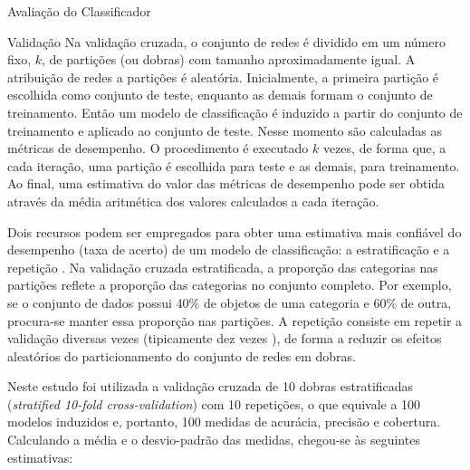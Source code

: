 \begin{section}{Avaliação do Classificador}
\begin{subsection}{Validação}
		Na validação cruzada, o conjunto de redes é dividido em um número fixo, $k$, de partições (ou dobras) com tamanho aproximadamente igual. A atribuição de redes a partições é aleatória. Inicialmente, a primeira partição é escolhida como conjunto de teste, enquanto as demais formam o conjunto de treinamento. Então um modelo de classificação é induzido a partir do conjunto de treinamento e aplicado ao conjunto de teste. Nesse momento são calculadas as métricas de desempenho. O procedimento é executado $k$ vezes, de forma que, a cada iteração, uma partição é escolhida para teste e as demais, para treinamento. Ao final, uma estimativa do valor das métricas de desempenho pode ser obtida através da média aritmética dos valores calculados a cada iteração.

		Dois recursos podem ser empregados para obter uma estimativa mais confiável do desempenho (taxa de acerto) de um modelo de classificação: a estratificação e a repetição \cite{Witten2005}. Na validação cruzada estratificada, a proporção das categorias nas partições reflete a proporção das categorias no conjunto completo. Por exemplo, se o conjunto de dados possui 40\% de objetos de uma categoria e 60\% de outra, procura-se manter essa proporção nas partições. A repetição consiste em repetir a validação diversas vezes (tipicamente dez vezes \cite{Witten2005}), de forma a reduzir os efeitos aleatórios do particionamento do conjunto de redes em dobras.

		Neste estudo foi utilizada a validação cruzada de 10 dobras estratificadas (\emph{stratified 10-fold cross-validation}) com 10 repetições, o que equivale a 100 modelos induzidos e, portanto, 100 medidas de acurácia, precisão e cobertura. Calculando a média e o desvio-padrão das medidas, chegou-se às seguintes estimativas:




\end{subsection}
\end{section}
